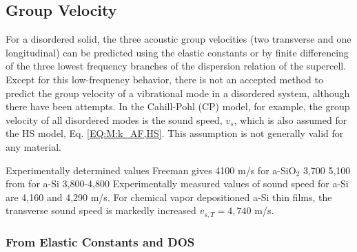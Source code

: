 \documentclass[aps,prb,twocolumn,superscriptaddress,footinbib,amsmath,amssymb,floatfix]{revtex4}
\begin{document}
\subsection{\label{S:Structure}Group Velocity}

For a disordered solid, the three acoustic group 
velocities (two transverse and one 
longitudinal) can be predicted using the elastic constants
\cite{gale_general_2003} 
or by finite differencing of the three lowest frequency branches 
of the dispersion relation of the supercell.
\cite{feldman_thermal_1993,feldman_numerical_1999,
donadio_atomistic_2009,he_thermal_2011,
he_heat_2011,hori_phonon_2013,larkin_predicting_2013} 
Except for this low-frequency behavior, there is not an 
accepted method to predict the group velocity of a 
vibrational mode in a disordered system, although there have been 
attempts.
\cite{cahill_lattice_1988,duda_reducing_2011,donadio_atomistic_2009,
he_heat_2011,he_thermal_2011} 
In the Cahill-Pohl (CP) model, for example, the group velocity of 
all disordered modes is the sound speed, $v_s$, which is also assumed  
for the HS model, Eq. \eqref{EQ:M:k_AF,HS}.
\cite{cahill_lattice_1988} This assumption is not generally valid  
for any material.\cite{feldman_numerical_1999,duda_reducing_2011,
donadio_atomistic_2009,he_heat_2011,he_thermal_2011,larkin_predicting_2013}

Experimentally determined values
Freeman gives 4100 m/s for a-SiO$_2$\cite{freeman_thermal_1986}
3,700 5,100 from \cite{pohl_low-temperature_2002}
for a-Si 3,800-4,800\cite{pohl_low-temperature_2002}
Experimentally measured values of sound speed for a-Si are 4,160
\cite{senn_physics_1979} and 
4,290 m/s\cite{vacher_attenuation_1980}.
\cite{feldman_elastic_1991} 
For chemical vapor depositioned a-Si thin films, the transverse 
sound speed is markedly increased $v_{s,T} = 4,740$ m/s.
\cite{liu_high_2009} 


\subsubsection{\label{S:Structure}From Elastic Constants and DOS}
\end{document}
